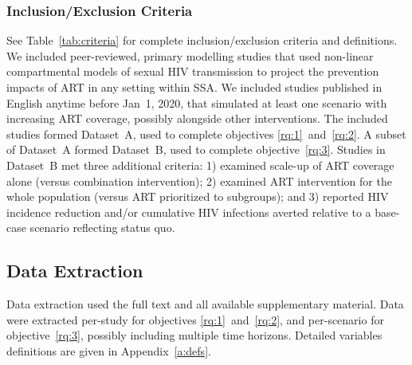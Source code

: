 \subsubsection{Inclusion/Exclusion Criteria}
\label{sss:meth:criteria}
See Table~\ref{tab:criteria} for complete inclusion/exclusion criteria and definitions.
We included peer-reviewed, primary modelling studies that used
non-linear compartmental models of sexual HIV transmission
to project the prevention impacts of ART in any setting within SSA.
We included studies published in English anytime before Jan~1, 2020,
that simulated at least one scenario with increasing ART coverage,
possibly alongside other interventions.
The included studies formed Dataset~A, used to complete objectives \ref{rq:1}~and~\ref{rq:2}.
A subset of Dataset~A formed Dataset~B, used to complete objective~\ref{rq:3}.
Studies in Dataset~B met three additional criteria:
1) examined scale-up of ART coverage alone (versus combination intervention);
2) examined ART intervention for the whole population (versus ART prioritized to subgroups); and
3) reported HIV incidence reduction and/or cumulative HIV infections averted
relative to a base-case scenario reflecting status quo.
\subsection{Data Extraction}
\label{ss:meth:data}
Data extraction used the full text and all available supplementary material.
Data were extracted per-study for objectives \ref{rq:1}~and~\ref{rq:2}, and
per-scenario for objective~\ref{rq:3}, possibly including multiple time horizons.
Detailed variables definitions are given in Appendix~\ref{a:defs}.
